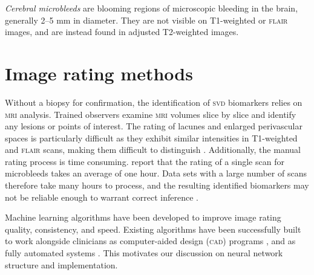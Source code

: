 \textit{Cerebral microbleeds} are blooming regions of microscopic bleeding in the brain, generally 2--5 mm in diameter. They are not visible on T1-weighted or \textsc{flair} images, and are instead found in adjusted T2-weighted images. 

%

\section{Image rating methods}\label{svd-rating}

Without a biopsy for confirmation, the identification of \textsc{svd} biomarkers relies on \textsc{mri} analysis. Trained observers examine \textsc{mri} volumes slice by slice and identify any lesions or points of interest. The rating of lacunes and enlarged perivascular spaces is particularly difficult as they exhibit similar intensities in T1-weighted and \textsc{flair} scans, making them difficult to distinguish \citep{PotterGillian2015CPSV}. Additionally, the manual rating process is time consuming. \cite{Heuvel2016} report that the rating of a single scan for microbleeds takes an average of one hour. Data sets with a large number of scans therefore take many hours to process, and the resulting identified biomarkers may not be reliable enough to warrant correct inference \citep{BenjaminJ.Philip2018LIbN, WardlawJ.M.2013Nsfr}.

Machine learning algorithms have been developed to improve image rating quality, consistency, and speed. Existing algorithms have been successfully built to work alongside clinicians as computer-aided design (\textsc{cad}) programs \citep{Heuvel2016, Uchiyama20071554, Yokoyama2007}, and as fully automated systems \citep{DouQ.2016ADoC, GhafoorianM.2017Dml3}. This motivates our discussion on neural network structure and implementation.





